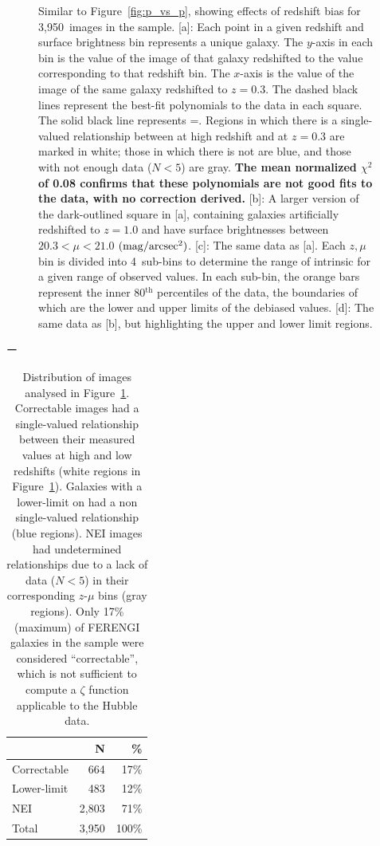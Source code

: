 \documentclass[twocolumn]{aastex6}
\begin{document}
\begin{figure}
\caption{Similar to Figure~\ref{fig:p_vs_p}, showing effects of redshift bias for 3,950~images in the \ferengi{} sample. [a]: Each point in a given redshift and surface brightness bin represents a unique galaxy. The $y$-axis in each bin is the \pfeatures{} value of the image of that galaxy redshifted to the value corresponding to that redshift bin. The $x$-axis is the \pfeatures{} value of the image of the same galaxy redshifted to $z=0.3$. The dashed black lines represent the best-fit polynomials to the data in each square. The solid black line represents \pfeaturesz=\pfeaturesrest. Regions in which there is a single-valued relationship between \pfeatures{} at high redshift and at $z=0.3$ are marked in white; those in which there is not are blue, and those with not enough data ($N<5$) are gray. \textbf{The mean normalized $\chi^2$ of 0.08 confirms that these polynomials are not good fits to the data, with no correction derived.} [b]: A larger version of the dark-outlined square in [a], containing \ferengi{} galaxies artificially redshifted to $z=1.0$ and have surface brightnesses between $20.3 < \mu < 21.0$ $\rm (mag/arcsec^2)$. [c]: The same data as [a]. Each $z,\mu$ bin is divided into 4~sub-bins to determine the range of intrinsic \pfeaturesrest{} for a given range of observed \pfeaturesz{} values. In each sub-bin, the orange bars represent the inner 80$^\mathrm{th}$ percentiles of the data, the boundaries of which are the lower and upper limits of the debiased values. [d]: The same data as [b], but highlighting the upper and lower limit regions.}
\label{fig:p_vs_p_bar}
\end{figure}

\begin{table}ー
\label{tbl:ferengi_bar}
\caption{Distribution of \ferengi{} images analysed in Figure~\ref{fig:p_vs_p_bar}. Correctable images had a single-valued relationship between their measured \pbar{} values at high and low redshifts (white regions in Figure~\ref{fig:p_vs_p_bar}). Galaxies with a lower-limit on \pbar{} had a non single-valued relationship (blue regions). NEI images had undetermined relationships due to a lack of data ($N<5$) in their corresponding $z$-$\mu$ bins (gray regions). Only 17\% (maximum) of FERENGI galaxies in the sample were considered ``correctable'', which is not sufficient to compute a $\zeta$ function applicable to the Hubble data.   \label{tbl:ferengi_bar_corrections}}
\begin{tabular}{lrr}
\hline \hline
				                   & N       & \% \\
\hline 
Correctable                        & 664   & 17\% \\
Lower-limit                        & 483   & 12\% \\
NEI                                & 2,803     & 71\%\\
Total                              & 3,950   & 100\% \\
\hline \hline
\end{tabular}
\end{table}
\end{document}
